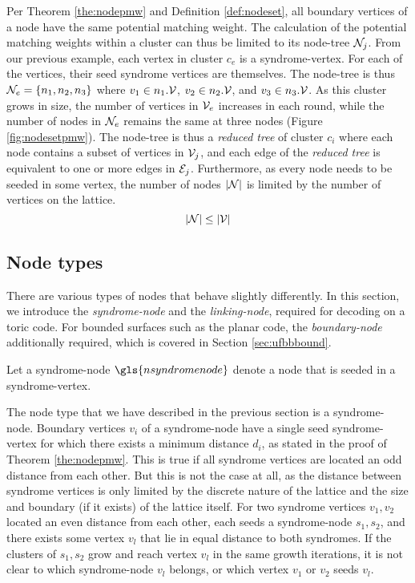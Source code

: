 Per Theorem \ref{the:nodepmw} and Definition \ref{def:nodeset}, all boundary vertices of a node have the same potential matching weight. The calculation of the potential matching weights within a cluster can thus be limited to its node-tree $\mathcal{N}_j$. From our previous example, each vertex in cluster $c_e$ is a syndrome-vertex. For each of the vertices, their seed syndrome vertices are themselves. The node-tree is thus $\mathcal{N}_e = \{n_1, n_2, n_3\}$ where $v_1 \in n_1.\mathcal{V}$, $v_2 \in n_2.\mathcal{V}$, and $v_3 \in n_3.\mathcal{V}$. As this cluster grows in size, the number of vertices in $\mathcal{V}_e$ increases in each round, while the number of nodes in $\mathcal{N}_e$ remains the same at three nodes (Figure \ref{fig:nodesetpmw}). The node-tree is thus a \emph{reduced tree} of cluster $c_i$ where each node contains a subset of vertices in $\mathcal{V}_j$, and each edge of the \emph{reduced tree} is equivalent to one or more edges in $\mathcal{E}_j$. Furthermore, as every node needs to be seeded in some vertex, the number of nodes $|\mathcal{N}|$ is limited by the number of vertices on the lattice. 
\begin{equation}\label{eq:sets}  
  \abs{\mathcal{N}} \leq \abs{\mathcal{V}} 
\end{equation}


\subsection{Node types}

There are various types of nodes that behave slightly differently. In this section, we introduce the \emph{syndrome-node} and the \emph{linking-node}, required for decoding on a toric code. For bounded surfaces such as the planar code, the \emph{boundary-node} additionally required, which is covered in Section \ref{sec:ufbbbound}. 

\begin{definition}\label{def:syndromenode}
  Let a syndrome-node $\gls{nsyndromenode}$ denote a node that is seeded in a syndrome-vertex. 
\end{definition}

The node type that we have described in the previous section is a syndrome-node. Boundary vertices $v_i$ of a syndrome-node have a single seed syndrome-vertex for which there exists a minimum distance $d_i$, as stated in the proof of Theorem \ref{the:nodepmw}. This is true if all syndrome vertices are located an odd distance from each other. But this is not the case at all, as the distance between syndrome vertices is only limited by the discrete nature of the lattice and the size and boundary (if it exists) of the lattice itself. For two syndrome vertices $v_1, v_2$ located an even distance from each other, each seeds a syndrome-node $s_1, s_2$, and there exists some vertex $v_{l}$ that lie in equal distance to both syndromes. If the clusters of $s_1, s_2$ grow and reach vertex $v_{l}$ in the same growth iterations, it is not clear to which syndrome-node $v_l$ belongs, or which vertex $v_1$ or $v_2$ seeds $v_l$. 

